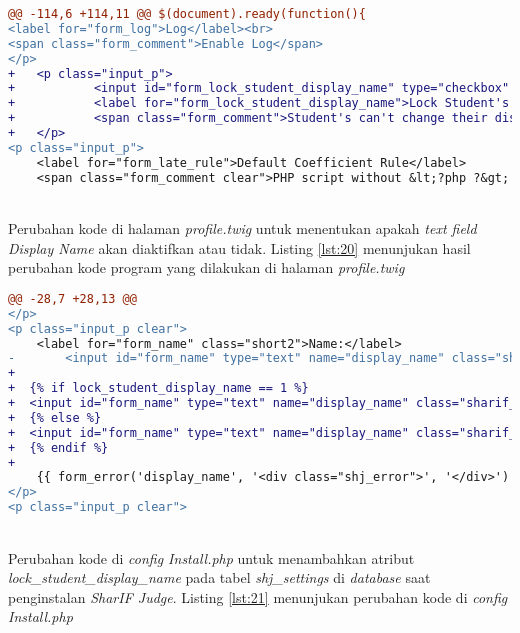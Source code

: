 \begin{lstlisting}[language=diff, caption=Perubahan kode program pada halaman \textit{settings.twig}, label=lst:19, basicstyle=\ttfamily, frame=single,
columns=fullflexible, keepspaces=true, breaklines=true]
@@ -114,6 +114,11 @@ $(document).ready(function(){
<label for="form_log">Log</label><br>
<span class="form_comment">Enable Log</span>
</p>
+   <p class="input_p">
+   		<input id="form_lock_student_display_name" type="checkbox" name="lock_student_display_name" value="1" {{ lock_student_display_name ? 'checked' }}/>
+   		<label for="form_lock_student_display_name">Lock Student's Display Name</label><br>
+           <span class="form_comment">Student's can't change their display name</span>
+   </p>
<p class="input_p">
	<label for="form_late_rule">Default Coefficient Rule</label>
	<span class="form_comment clear">PHP script without &lt;?php ?&gt; tags</span><br>
\end{lstlisting}
~\\
Perubahan kode di halaman \textit{profile.twig} untuk menentukan apakah \textit{text field Display Name} akan diaktifkan atau tidak. Listing \ref{lst:20} menunjukan hasil perubahan kode program yang dilakukan di halaman \textit{profile.twig}

\begin{lstlisting}[language=diff, caption=Perubahan kode program pada halaman \textit{profile.twig}, label=lst:20, basicstyle=\ttfamily, frame=single,
columns=fullflexible, keepspaces=true, breaklines=true]
@@ -28,7 +28,13 @@
</p>
<p class="input_p clear">
	<label for="form_name" class="short2">Name:</label>
-       <input id="form_name" type="text" name="display_name" class="sharif_input medium" value="{{ display_name }}"/>
+
+  {% if lock_student_display_name == 1 %}
+  <input id="form_name" type="text" name="display_name" class="sharif_input medium" value="{{ display_name }}" disabled/>
+  {% else %}
+  <input id="form_name" type="text" name="display_name" class="sharif_input medium" value="{{ display_name }}"/>
+  {% endif %}
+
	{{ form_error('display_name', '<div class="shj_error">', '</div>') }}
</p>
<p class="input_p clear">
\end{lstlisting}
~\\
Perubahan kode di \textit{config Install.php} untuk menambahkan atribut \linebreak \textit{lock\_student\_display\_name} pada tabel \textit{shj\_settings} di \textit{database} saat penginstalan \textit{SharIF Judge}. Listing \ref{lst:21} menunjukan perubahan kode di \textit{config Install.php}

